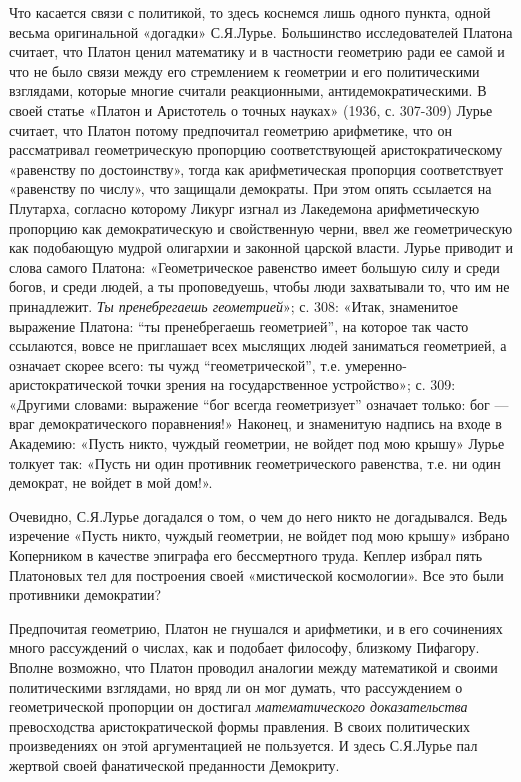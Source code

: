 Что касается связи с политикой, то здесь коснемся лишь одного пункта,
одной весьма оригинальной «догадки» С.Я.Лурье. Большинство
исследователей Платона считает, что Платон ценил математику и в
частности геометрию ради ее самой и что не было связи между его
стремлением к геометрии и его политическими взглядами, которые многие
считали реакционными, антидемократическими. В своей статье «Платон и
Аристотель о точных науках» (1936, с. 307-309) Лурье считает, что
Платон потому предпочитал геометрию арифметике, что он рассматривал
геометрическую пропорцию соответствующей аристократическому «равенству
по достоинству», тогда как арифметическая пропорция соответствует
«равенству по числу», что защищали демократы. При этом опять ссылается
на Плутарха, согласно которому Ликург изгнал из Лакедемона
арифметическую пропорцию как демократическую и свойственную черни,
ввел же геометрическую как подобающую мудрой олигархии и законной
царской власти. Лурье приводит и слова самого Платона: «Геометрическое
равенство имеет большую силу и среди богов, и среди людей, а ты
проповедуешь, чтобы люди захватывали то, что им не принадлежит.
\emph{Ты пренебрегаешь геометрией}»; с. 308: «Итак, знаменитое
выражение Платона: ``ты пренебрегаешь геометрией'', на которое так
часто ссылаются, вовсе не приглашает всех мыслящих людей заниматься
геометрией, а означает скорее всего: ты чужд ``геометрической'', т.е.
умеренно-аристократической точки зрения на государственное
устройство»; с. 309: «Другими словами: выражение ``бог всегда
геометризует'' означает только: бог --- враг демократического
поравнения!» Наконец, и знаменитую надпись на входе в Академию: «Пусть
никто, чуждый геометрии, не войдет под мою крышу» Лурье толкует так:
«Пусть ни один противник геометрического равенства, т.е. ни один
демократ, не войдет в мой дом!».

Очевидно, С.Я.Лурье догадался о том, о чем до него никто не
догадывался. Ведь изречение «Пусть никто, чуждый геометрии, не войдет
под мою крышу» избрано Коперником в качестве эпиграфа его бессмертного
труда. Кеплер избрал пять Платоновых тел для построения своей
«мистической космологии». Все это были противники демократии?

Предпочитая геометрию, Платон не гнушался и арифметики, и в его
сочинениях много рассуждений о числах, как и подобает философу,
близкому Пифагору. Вполне возможно, что Платон проводил аналогии между
математикой и своими политическими взглядами, но вряд ли он мог
думать, что рассуждением о геометрической пропорции он достигал
\emph{математического доказательства} превосходства аристократической
формы правления. В своих политических произведениях он этой
аргументацией не пользуется. И здесь С.Я.Лурье пал жертвой своей
фанатической преданности Демокриту.

